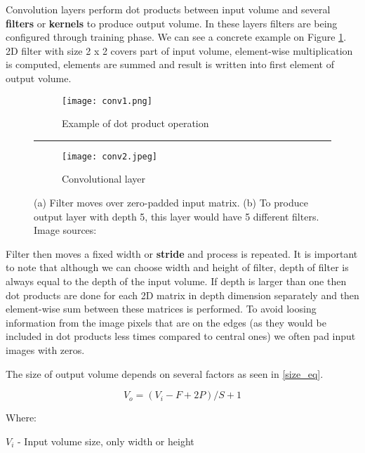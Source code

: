 Convolution layers perform dot products between input volume and several \textbf{filters} or \textbf{kernels} to produce output volume.
In these layers filters are being configured through training phase.
We can see a concrete example on Figure \ref{conv1}.
2D filter with size 2 x 2 covers part of input volume, element-wise multiplication is computed, elements are summed and result is written into first element of output volume.

\begin{figure}[ht] 
    \centering
    \begin{subfigure}[b]{0.75\textwidth}
        \texttt{[image: conv1.png]} 
        \caption{Example of dot product operation}
        \label{conv1}
    \end{subfigure}
    \vspace{0.5cm}
    \hrule
    \vspace{0.5cm}
    \begin{subfigure}[b]{0.5\textwidth}
        \texttt{[image: conv2.jpeg]} 
        \caption{ Convolutional layer}
        \label{con2v}
    \end{subfigure}
    
    \caption{ (a) Filter moves over zero-padded input matrix. (b) To produce output layer with depth 5, this layer would have 5 different filters. Image sources: \cite{conv_layer_img}\cite{cs231n}}
    \label{conv_layer}
\end{figure}

Filter then moves a fixed width or \textbf{stride} and process is repeated.
It is important to note that although we can choose width and height of filter, depth of filter is always equal to the depth of the input volume.
If depth is larger than one then dot products are done for each 2D matrix in depth dimension separately and then element-wise sum between these matrices is performed.
To avoid loosing information from the image pixels that are on the edges (as they would be included in dot products less times compared to central ones) we often pad input images with zeros.

The size of output volume depends on several factors as seen in \ref{size_eq}.

\begin{equation}\label{size_eq}
V_{o} = (V_{i} - F + 2P) / S + 1
\end{equation}

Where:

$V_{i}$ - Input volume size, only width or height


